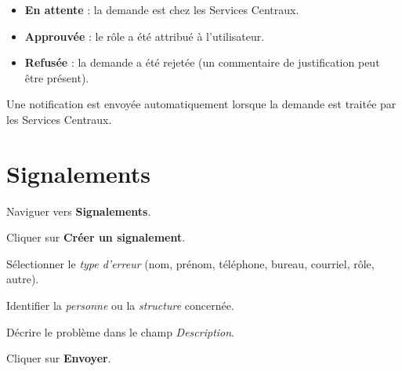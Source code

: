 \begin{itemize}
  \item \textbf{En attente} : la demande est chez les Services Centraux.
  \item \textbf{Approuv\'ee} : le r\^ole a \'et\'e attribu\'e \`a l'utilisateur.
  \item \textbf{Refus\'ee} : la demande a \'et\'e rejet\'ee (un commentaire de justification peut \^etre pr\'esent).
\end{itemize}

\begin{notebox}
  Une notification est envoy\'ee automatiquement lorsque la demande est trait\'ee par les Services Centraux.
\end{notebox}

\section{Signalements}

\begin{steps}
  \item Naviguer vers \textbf{Signalements}.
  \item Cliquer sur \textbf{Cr\'eer un signalement}.
  \item S\'electionner le \textit{type d'erreur} (nom, pr\'enom, t\'el\'ephone, bureau, courriel, r\^ole, autre).
  \item Identifier la \textit{personne} ou la \textit{structure} concern\'ee.
  \item D\'ecrire le probl\`eme dans le champ \textit{Description}.
  \item Cliquer sur \textbf{Envoyer}.
\end{steps}

